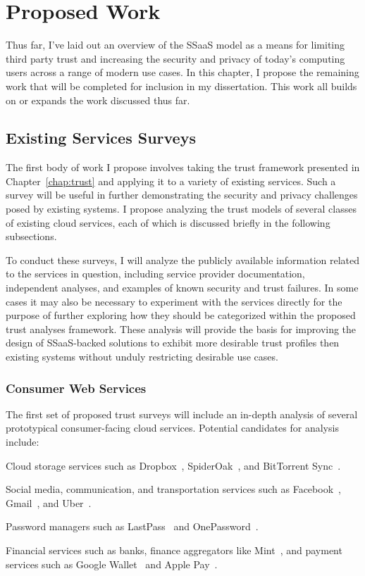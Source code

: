 \chapter{Proposed Work}
\label{chap:planned}

Thus far, I've laid out an overview of the SSaaS model as a means for
limiting third party trust and increasing the security and privacy of
today's computing users across a range of modern use cases. In this
chapter, I propose the remaining work that will be completed for
inclusion in my dissertation. This work all builds on or expands the
work discussed thus far.

\section{Existing Services Surveys}
\label{chap:planned:survey}

The first body of work I propose involves taking the trust framework
presented in Chapter~\ref{chap:trust} and applying it to a variety of
existing services. Such a survey will be useful in further
demonstrating the security and privacy challenges posed by existing
systems. I propose analyzing the trust models of several classes of
existing cloud services, each of which is discussed briefly in the
following subsections.

To conduct these surveys, I will analyze the publicly available
information related to the services in question, including service
provider documentation, independent analyses, and examples of known
security and trust failures. In some cases it may also be necessary to
experiment with the services directly for the purpose of further
exploring how they should be categorized within the proposed trust
analyses framework. These analysis will provide the basis for
improving the design of SSaaS-backed solutions to exhibit more
desirable trust profiles then existing systems without unduly
restricting desirable use cases.

\subsection{Consumer Web Services}

The first set of proposed trust surveys will include an in-depth
analysis of several prototypical consumer-facing cloud
services. Potential candidates for analysis include:

\begin{packed_item}
\item Cloud storage services such as Dropbox~\cite{dropbox},
  SpiderOak~\cite{spideroak}, and BitTorrent
  Sync~\cite{bittorrent-sync}.
\item Social media, communication, and transportation services such as
  Facebook~\cite{facebook}, Gmail~\cite{google-gmail}, and
  Uber~\cite{uber}.
\item Password managers such as LastPass~\cite{lastpass} and
  OnePassword~\cite{onepassword}.
\item Financial services such as banks, finance aggregators like
  Mint~\cite{mint}, and payment services such as Google
  Wallet~\cite{google-wallet} and Apple Pay~\cite{apple-pay}.
\end{packed_item}

